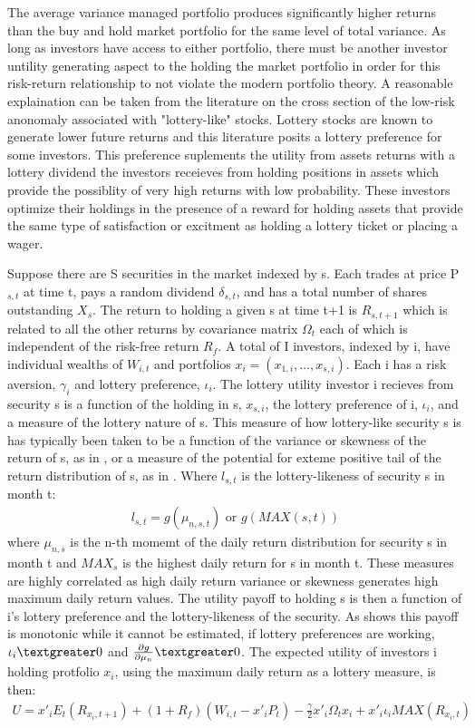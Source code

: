 The average variance managed portfolio produces significantly higher returns than the buy and hold market portfolio for the same level of total variance. As long as investors have access to either portfolio, there must be another investor untility generating aspect to the holding the market portfolio in order for this risk-return relationship to not violate the modern portfolio theory. A reasonable explaination can be taken from the literature on the cross section of the low-risk anonomaly associated with "lottery-like" stocks. Lottery stocks are known to generate lower future returns and this literature posits a lottery preference for some investors. \citep{barberis_stocks_2008} This preference suplements the utility from assets returns with a lottery dividend the investors receieves from holding positions in assets which provide the possiblity of very high returns with low probability. These investors optimize their holdings in the presence of a reward for holding assets that provide the same type of satisfaction or excitment as holding a lottery ticket or placing a wager.

Suppose there are S securities in the market indexed by s. Each trades at price P$_{s,t}$ at time t, pays a random dividend $\delta_{s,t}$, and has a total number of shares outstanding $X_{s}$. The return to holding a given s at time t+1 is $R_{s,t+1}$ which is related to all the other returns by covariance matrix $\Omega_{t}$ each of which is independent of the risk-free return $R_{f}$. A total of I investors, indexed by i, have individual wealths of $W_{i,t}$ and portfolios $x_{i} = (x_{1,i},\dots,x_{s,i})$. Each i has a risk aversion, $\gamma_{i}$ and lottery preference, $\iota_{i}$. The lottery utility investor i recieves from security s is a function of the holding in s, $x_{s,i}$, the lottery preference of i, $\iota_{i}$, and a measure of the lottery nature of s. This measure of how lottery-like security s is has typically been taken to be a function of the variance or skewness of the return of s, as in \citet{kumar_who_2009}, or a measure of the potential for exteme positive tail of the return distribution of s, as in \citet{bali_maxing_2011}. Where $l_{s,t}$ is the lottery-likeness of security s in month t:
\begin{align}
	l_{s,t} = g(\mu_{n,s,t}) \text{ or } g(MAX(s,t))
\end{align}
where $\mu_{n,s}$ is the n-th momemt of the daily return distribution for security s in month t and $MAX_{s}$ is the highest daily return for s in month t. These measures are highly correlated as high daily return variance or skewness generates high maximum daily return values. The utility payoff to holding s is then a function of i's lottery preference and the lottery-likeness of the security. As \cite{fong_risk_2013} shows this payoff is monotonic while it cannot be estimated, if lottery preferences are working, $\iota_{i} \textgreater 0$ and $\frac{\partial g}{\partial \mu_{n}} \textgreater 0$. The expected utility of investors i holding protfolio $x_{i}$, using the maximum daily return as a lottery measure, is then:
\begin{align}
	U = x'_{i}E_{t}(R_{x_{i},t+1}) + (1 + R_{f})(W_{i,t} - x'_{i}P_{t})-\frac{\gamma}{2}x'_{i}\Omega_{t}x_{i} + x'_{i}\iota_{i}MAX(R_{x_{i},t})
\end{align}
